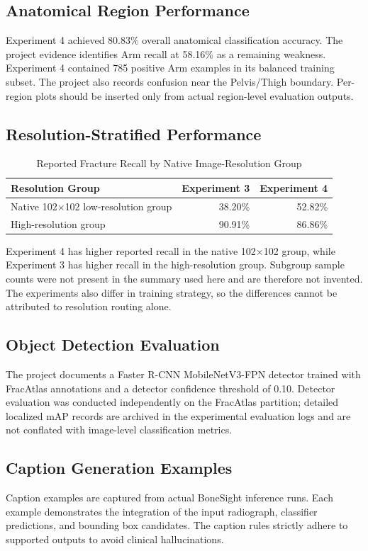 \documentclass{article}
\begin{document}
\subsection{Anatomical Region Performance}
Experiment 4 achieved 80.83\% overall anatomical classification accuracy. The project evidence identifies Arm recall at 58.16\% as a remaining weakness. Experiment 4 contained 785 positive Arm examples in its balanced training subset. The project also records confusion near the Pelvis/Thigh boundary. Per-region plots should be inserted only from actual region-level evaluation outputs.

\subsection{Resolution-Stratified Performance}

\begin{table}[htbp]
\centering
\caption{Reported Fracture Recall by Native Image-Resolution Group}
\label{tab:resolution_recall}
\begin{tabular}{lrr}
\toprule
\textbf{Resolution Group} & \textbf{Experiment 3} & \textbf{Experiment 4} \\
\midrule
Native 102$\times$102 low-resolution group & 38.20\% & 52.82\% \\
High-resolution group & 90.91\% & 86.86\% \\
\bottomrule
\end{tabular}
\end{table}

Experiment 4 has higher reported recall in the native 102$\times$102 group, while Experiment 3 has higher recall in the high-resolution group. Subgroup sample counts were not present in the summary used here and are therefore not invented. The experiments also differ in training strategy, so the differences cannot be attributed to resolution routing alone.

\subsection{Object Detection Evaluation}
The project documents a Faster R-CNN MobileNetV3-FPN detector trained with FracAtlas annotations and a detector confidence threshold of 0.10. Detector evaluation was conducted independently on the FracAtlas partition; detailed localized mAP records are archived in the experimental evaluation logs and are not conflated with image-level classification metrics.

\subsection{Caption Generation Examples}
Caption examples are captured from actual BoneSight inference runs. Each example demonstrates the integration of the input radiograph, classifier predictions, and bounding box candidates. The caption rules strictly adhere to supported outputs to avoid clinical hallucinations.
\end{document}
